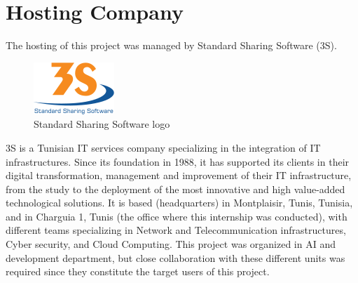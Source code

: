 \section{Hosting Company}
The hosting of this project was managed by Standard Sharing Software (3S).
\smallskip\newline
\begin{figure}[htbp]
    \centering
    \includegraphics[width=0.4\linewidth]{./figures/logo_3S.png}
    \caption{Standard Sharing Software logo}
\end{figure}\newline
3S is a Tunisian IT services company specializing in the integration of IT infrastructures. Since its foundation in 1988, it has supported its clients in their digital transformation, management and improvement of their IT infrastructure, from the study to the deployment of the most innovative and high value-added technological solutions.
It is based (headquarters) in Montplaisir, Tunis, Tunisia, and in Charguia 1, Tunis (the office where this internship was conducted), with different teams specializing in Network and Telecommunication infrastructures, Cyber security, and Cloud Computing. This project was organized in AI and development department, but close collaboration with these different units was required since they constitute the target users of this project.
\newpage

